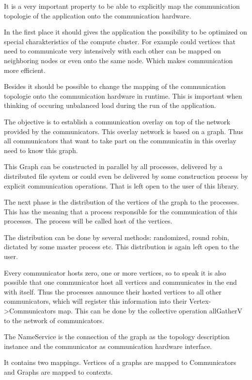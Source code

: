 It is a very important property to be able to explicitly map the
communication topologie of the application onto the communication
hardware.

In the first place it should gives the application the possibility to
be optimized on special charakteristics of the compute cluster. For
example could vertices that need to communicate very intensively with
each other can be mapped on neighboring nodes or even onto the same
node. Which makes communication more efficient.

Besides it should be possible to change the mapping of the
communication topologie onto the communication hardware in
runtime. This is important when thinking of occuring unbalanced load
during the run of the application.

The objective is to establish a communication overlay on top of the
network provided by the communicators. This overlay network is based
on a graph. Thus all communicators that want to take part on the
communicatin in this overlay need to know this graph.

This Graph can be constructed in parallel by all processes, delivered
by a distributed file system or could even be delivered by some
construction process by explicit communication operations. That is
left open to the user of this library.

The next phase is the distribution of the vertices of the graph to the
processes. This has the meaning that a process responsible for the
communication of this processes. The process will be called host of
the vertices.

The distribution can be done by several methods: randomized, round
robin, dictated by some master process etc. This distribution is again
left open to the user.

Every communicator hosts zero, one or more vertices, so to speak it is
also possible that one communicator host all vertices and communicates
in the end with itself.  Thus the processes announce their hosted
vertices to all other communicators, which will register this
information into their Vertex->Communicators map.  This can be done by
the collective operation allGatherV to the network of communicators.


The NameService is the connection of the graph as the topology
description instance and the communicator as communication hardware
interface.

It contains two mappings. Vertices of a graphs are mapped to
Communicators and Graphs are mapped to contexts.

